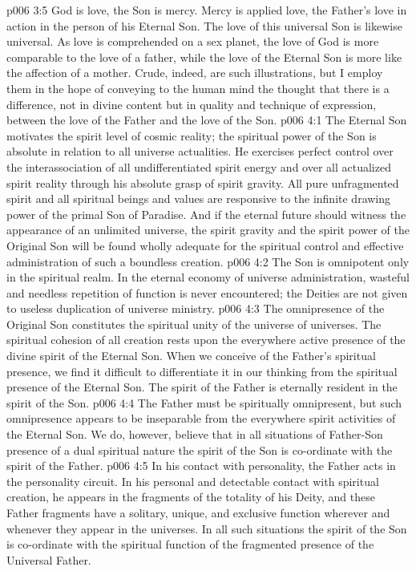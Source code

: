 \vs p006 3:5 God is love, the Son is mercy. Mercy is applied love, the Father’s love in action in the person of his Eternal Son. The love of this universal Son is likewise universal. As love is comprehended on a sex planet, the love of God is more comparable to the love of a father, while the love of the Eternal Son is more like the affection of a mother. Crude, indeed, are such illustrations, but I employ them in the hope of conveying to the human mind the thought that there is a difference, not in divine content but in quality and technique of expression, between the love of the Father and the love of the Son.
\vs p006 4:1 The Eternal Son motivates the spirit level of cosmic reality; the spiritual power of the Son is absolute in relation to all universe actualities. He exercises perfect control over the interassociation of all undifferentiated spirit energy and over all actualized spirit reality through his absolute grasp of spirit gravity. All pure unfragmented spirit and all spiritual beings and values are responsive to the infinite drawing power of the primal Son of Paradise. And if the eternal future should witness the appearance of an unlimited universe, the spirit gravity and the spirit power of the Original Son will be found wholly adequate for the spiritual control and effective administration of such a boundless creation.
\vs p006 4:2 \pc The Son is omnipotent only in the spiritual realm. In the eternal economy of universe administration, wasteful and needless repetition of function is never encountered; the Deities are not given to useless duplication of universe ministry.
\vs p006 4:3 \pc The omnipresence of the Original Son constitutes the spiritual unity of the universe of universes. The spiritual cohesion of all creation rests upon the everywhere active presence of the divine spirit of the Eternal Son. When we conceive of the Father’s spiritual presence, we find it difficult to differentiate it in our thinking from the spiritual presence of the Eternal Son. The spirit of the Father is eternally resident in the spirit of the Son.
\vs p006 4:4 The Father must be spiritually omnipresent, but such omnipresence appears to be inseparable from the everywhere spirit activities of the Eternal Son. We do, however, believe that in all situations of Father\hyp{}Son presence of a dual spiritual nature the spirit of the Son is co\hyp{}ordinate with the spirit of the Father.
\vs p006 4:5 In his contact with personality, the Father acts in the personality circuit. In his personal and detectable contact with spiritual creation, he appears in the fragments of the totality of his Deity, and these Father fragments have a solitary, unique, and exclusive function wherever and whenever they appear in the universes. In all such situations the spirit of the Son is co\hyp{}ordinate with the spiritual function of the fragmented presence of the Universal Father.
